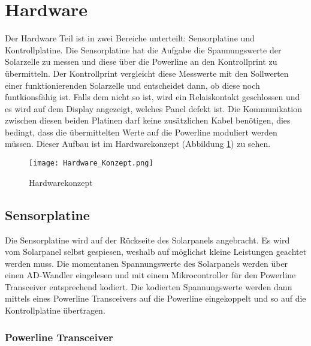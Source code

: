 %
%
%

\section{Hardware}

Der Hardware Teil ist in zwei Bereiche unterteilt: Sensorplatine und Kontrollplatine. Die Sensorplatine hat die Aufgabe die Spannungswerte der Solarzelle zu messen und diese über die Powerline an den Kontrollprint zu übermitteln.
Der Kontrollprint vergleicht diese Messwerte mit den Sollwerten einer funktionierenden Solarzelle und entscheidet dann, ob diese noch funtkionsfähig ist. Falls dem nicht so ist, wird ein Relaiskontakt geschlossen und es wird auf dem Display angezeigt, welches Panel defekt ist.
Die Kommunikation zwischen diesen beiden Platinen darf keine zusätzlichen Kabel benötigen, dies bedingt, dass die übermittelten Werte auf die Powerline moduliert werden müssen. Dieser Aufbau ist im Hardwarekonzept (Abbildung \ref{fig::Hardwarekonzept}) zu sehen.

\begin{figure}[h]
\centering
\texttt{[image: Hardware\_Konzept.png]}%
\caption{Hardwarekonzept}
\label{fig::Hardwarekonzept}%
\end{figure}

\subsection{Sensorplatine}


Die Sensorplatine wird auf der Rückseite des Solarpanels angebracht. Es wird vom Solarpanel selbst gespiesen, weshalb auf möglichst kleine Leistungen geachtet werden muss. Die momentanen Spannungswerte des Solarpanels werden über einen AD-Wandler eingelesen und mit einem Mikrocontroller für den Powerline Transceiver entsprechend kodiert. Die kodierten Spannungswerte werden dann mittels eines Powerline Transceivers auf die Powerline eingekoppelt und so auf die Kontrollplatine übertragen.

\newpage
\subsubsection{Powerline Transceiver}

